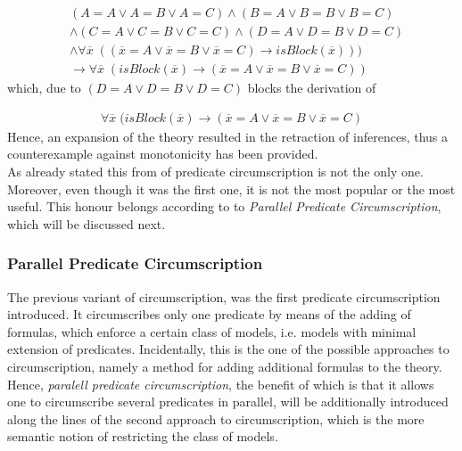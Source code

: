 \documentclass{article}
\begin{document}
\begin{equation*}
\begin{split}
&(A=A \vee A=B \vee A=C)\wedge (B=A \vee B=B \vee B=C) \\
& \wedge (C=A \vee C=B \vee C=C) \wedge (D=A \vee D=B \vee D=C) \\
& \wedge \forall \overline{x} \; ((\overline{x}=A \vee \overline{x}=B \vee \overline{x}=C)\to isBlock(\overline{x})))  \\
& \to  \forall \overline{x} \; (isBlock(\overline{x})   \to  (\overline{x}=A \vee \overline{x}=B \vee \overline{x}=C ))
\end{split}
\end{equation*} 
which, due to $(D=A \vee D=B \vee D=C)$  blocks the derivation of 

\begin{equation*}
\begin{split}
 \forall \overline{x} \; (isBlock(\overline{x})   \to  (\overline{x}=A \vee \overline{x}=B \vee \overline{x}=C )
\end{split}
\end{equation*} 
Hence, an expansion of the theory resulted in the retraction of inferences, thus a counterexample against monotonicity has been provided. \\
As already stated this from of predicate circumscription is not the only one. Moreover, even though it was the first one, it is not the most popular or the most useful. This honour belongs according to \cite{brewka1997nonmonotonic} to \emph{Parallel Predicate Circumscription}, which will be discussed next.


\subsubsection{Parallel Predicate Circumscription}
The previous variant of circumscription, was the first predicate circumscription introduced. It circumscribes only one predicate by means of the adding of formulas, which enforce a certain class of models, i.e. models with minimal extension of predicates. Incidentally, this is the one of the possible approaches to circumscription, namely a method for adding additional formulas to the theory. Hence, \emph{paralell predicate circumscription}, the benefit of which is that it allows one to circumscribe several predicates in parallel, will be additionally introduced along the lines of the second approach to circumscription, which is the more semantic notion of restricting the class of models.  \cite{BOCHMAN2007557, brewka1997nonmonotonic} \\
\end{document}

